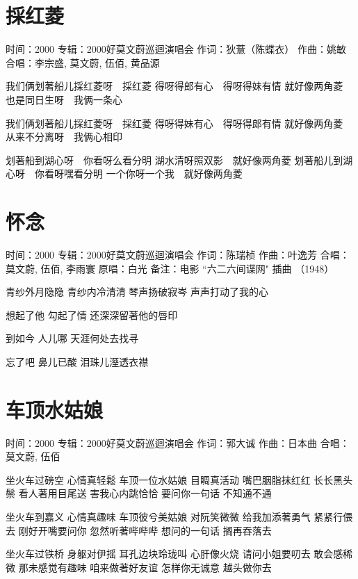 \documentclass[UTF8,a4paper,oneside,twocolumn,12pt]{ctexbook}
\newcommand{\infopair}[2]{\textbullet #1：#2}
\newcommand{\zc}[1][伍佰]{\infopair{作词}{#1}}
\newcommand{\zq}[1][伍佰]{\infopair{作曲}{#1}}
\newcommand{\zj}[1]{\infopair{专辑}{#1}}
\newcommand{\yc}[1]{\infopair{原唱}{#1}}
\newcommand{\sj}[1]{\infopair{时间}{#1}}
\newcommand{\bz}[1]{\infopair{备注}{#1}}
\newenvironment{info}{\begin{flushleft}\kaishu
	}
	{\end{flushleft}\normalsize\yahei\par}
\newenvironment{lyric}{
	}
{}
\begin{document}
\section{採红菱}
\begin{info}
	\sj{2000}
	\zj{2000好莫文蔚巡迴演唱会}
	\zc[狄薏（陈蝶衣）]
	\zq[姚敏]
	\infopair{合唱}{李宗盛, 莫文蔚, 伍佰, 黄品源}
\end{info}
\begin{lyric}
	我们俩划著船儿採红菱呀　採红菱
	得呀得郎有心　得呀得妹有情
	就好像两角菱　也是同日生呀　我俩一条心

	我们俩划著船儿採红菱呀　採红菱
	得呀得妹有心　得呀得郎有情
	就好像两角菱　从来不分离呀　我俩心相印

	划著船到湖心呀　你看呀么看分明
	湖水清呀照双影　就好像两角菱
	划著船儿到湖心呀　你看呀嘿看分明
	一个你呀一个我　就好像两角菱
\end{lyric}

\section{怀念}
\begin{info}
	\sj{2000}
	\zj{2000好莫文蔚巡迴演唱会}
	\zc[陈瑞桢]
	\zq[叶逸芳]
	\infopair{合唱}{莫文蔚, 伍佰, 李雨寰}
	\yc{白光}
	\bz{电影 ``六二六间谍网" 插曲 （1948）}
\end{info}
\begin{lyric}
	青纱外月隐隐 青纱内冷清清
	琴声扬破寂岑 声声打动了我的心

	想起了他 勾起了情
	还深深留著他的唇印

	到如今 人儿哪
	天涯何处去找寻

	忘了吧 鼻儿已酸
	泪珠儿溼透衣襟
\end{lyric}

\section{车顶水姑娘}
\begin{info}
	\sj{2000}
	\zj{2000好莫文蔚巡迴演唱会}
	\zc[郭大诚]
	\zq[日本曲]
	\infopair{合唱}{莫文蔚, 伍佰}
\end{info}
\begin{lyric}
	坐火车过磅空 心情真轻鬆 车顶一位水姑娘 目睭真活动
	嘴巴胭脂抹红红 长长黑头鬃 看人著用目尾送 害我心内跳恰恰
	要问你一句话 不知通不通

	坐火车到嘉义 心情真趣味 车顶彼兮美姑娘 对阮笑微微
	给我加添著勇气 紧紧行偎去 刚好开嘴要问你 忽然听著哔哔哔
	想问的一句话 搁再吞落去

	坐火车过铁桥 身躯对伊摇 耳孔边块玲珑叫 心肝像火烧
	请问小姐要叨去 敢会感稀微 那未感觉有趣味 咱来做著好友谊
	怎样你无诚意 越头做你去
\end{lyric}
\end{document}
